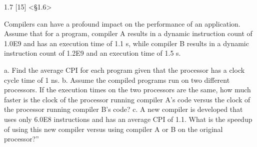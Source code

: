 \documentclass[paper=a4, fontsize=11pt]{scrartcl} %
\begin{document}
\begin{fancyquotes}
  1.7 [15] <§1.6>

  Compilers can have a profound impact on the performance of an
  application. Assume that for a program, compiler A results in a
  dynamic instruction count of 1.0E9 and has an execution time of 1.1
  s, while compiler B results in a dynamic instruction count of 1.2E9
  and an execution time of 1.5 s.

  a. Find the average CPI for each program given that the processor
  has a clock cycle time of 1 ns.
  b. Assume the compiled programs run on two different processors. If
  the execution times on the two processors are the same, how much
  faster is the clock of the processor running compiler A’s code
  versus the clock of the processor running compiler B’s code?
  c. A new compiler is developed that uses only 6.0E8 instructions and
  has an average CPI of 1.1. What is the speedup of using this new
  compiler versus using compiler A or B on the original processor?”
\end{fancyquotes}
\end{document}
